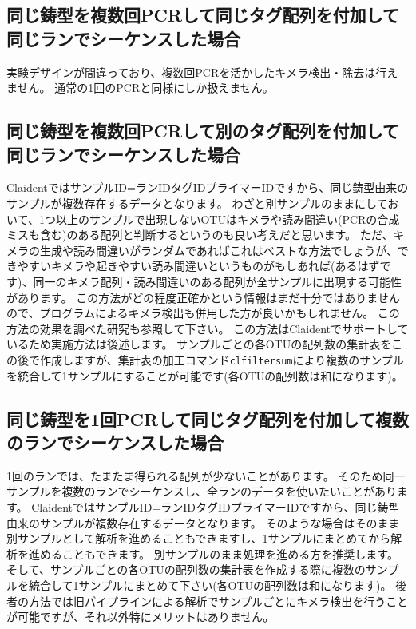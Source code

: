 \documentclass[titlepage,10pt,a4paper]{jsbook}
\begin{document}
\subsection{同じ鋳型を複数回PCRして同じタグ配列を付加して同じランでシーケンスした場合}

実験デザインが間違っており、複数回PCRを活かしたキメラ検出・除去は行えません。
通常の1回のPCRと同様にしか扱えません。

\subsection{同じ鋳型を複数回PCRして別のタグ配列を付加して同じランでシーケンスした場合}

ClaidentではサンプルID=ランID{\textunderscore}{\textunderscore}タグID{\textunderscore}{\textunderscore}プライマーIDですから、同じ鋳型由来のサンプルが複数存在するデータとなります。
わざと別サンプルのままにしておいて、1つ以上のサンプルで出現しないOTUはキメラや読み間違い(PCRの合成ミスも含む)のある配列と判断するというのも良い考えだと思います。
ただ、キメラの生成や読み間違いがランダムであればこれはベストな方法でしょうが、できやすいキメラや起きやすい読み間違いというものがもしあれば(あるはずです)、同一のキメラ配列・読み間違いのある配列が全サンプルに出現する可能性があります。
この方法がどの程度正確かという情報はまだ十分ではありませんので、プログラムによるキメラ検出も併用した方が良いかもしれません。
この方法の効果を調べた研究\citep{Lange2015}も参照して下さい。
この方法はClaidentでサポートしているため実施方法は後述します。
サンプルごとの各OTUの配列数の集計表をこの後で作成しますが、集計表の加工コマンド\texttt{clfiltersum}により複数のサンプルを統合して1サンプルにすることが可能です(各OTUの配列数は和になります)。

\subsection{同じ鋳型を1回PCRして同じタグ配列を付加して複数のランでシーケンスした場合}

1回のランでは、たまたま得られる配列が少ないことがあります。
そのため同一サンプルを複数のランでシーケンスし、全ランのデータを使いたいことがあります。
ClaidentではサンプルID=ランID{\textunderscore}{\textunderscore}タグID{\textunderscore}{\textunderscore}プライマーIDですから、同じ鋳型由来のサンプルが複数存在するデータとなります。
そのような場合はそのまま別サンプルとして解析を進めることもできますし、1サンプルにまとめてから解析を進めることもできます。
別サンプルのまま処理を進める方を推奨します。
そして、サンプルごとの各OTUの配列数の集計表を作成する際に複数のサンプルを統合して1サンプルにまとめて下さい(各OTUの配列数は和になります)。
後者の方法では旧パイプラインによる解析でサンプルごとにキメラ検出を行うことが可能ですが、それ以外特にメリットはありません。
\end{document}
